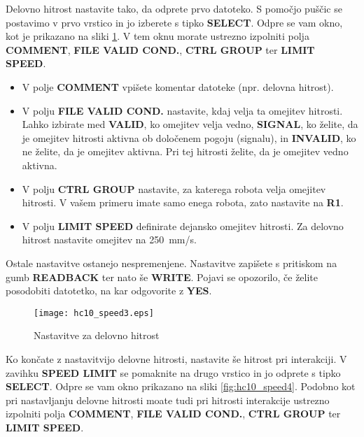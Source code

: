 Delovno hitrost nastavite tako, da odprete prvo datoteko. S pomočjo puščic se postavimo v prvo vrstico in jo izberete s tipko \textbf{SELECT}. Odpre se vam okno, kot je prikazano na sliki \ref{fig:hc10_speed3}. V tem oknu morate ustrezno izpolniti polja \textbf{COMMENT}, \textbf{FILE VALID COND.}, \textbf{CTRL GROUP} ter \textbf{LIMIT SPEED}.

\begin{itemize}
	\item V polje \textbf{COMMENT} vpišete komentar datoteke (npr. delovna hitrost).
	\item V polju \textbf{FILE VALID COND.} nastavite, kdaj velja ta omejitev hitrosti. Lahko izbirate med \textbf{VALID}, ko omejitev velja vedno, \textbf{SIGNAL}, ko želite, da je omejitev hitrosti aktivna ob določenem pogoju (signalu), in {\textbf{INVALID}}, ko ne želite, da je omejitev aktivna. Pri tej hitrosti želite, da je omejitev vedno aktivna.
	\item V polju \textbf{CTRL GROUP} nastavite, za katerega robota velja omejitev hitrosti. V vašem primeru imate samo enega robota, zato nastavite na \textbf{R1}.
	\item V polju \textbf{LIMIT SPEED} definirate dejansko omejitev hitrosti. Za delovno hitrost nastavite omejitev na 250~mm/s.
\end{itemize}

Ostale nastavitve ostanejo nespremenjene. Nastavitve zapišete s pritiskom na gumb \textbf{READBACK} ter nato še \textbf{WRITE}. Pojavi se opozorilo, če želite posodobiti datotetko, na kar odgovorite z \textbf{YES}.

\begin{figure}[!hbt]
	\centering
	\texttt{[image: hc10\_speed3.eps]}
	\caption{Nastavitve za delovno hitrost}
	\label{fig:hc10_speed3}
\end{figure}

Ko končate z nastavitvijo delovne hitrosti, nastavite še hitrost pri interakciji. V zavihku \textbf{SPEED LIMIT} se pomaknite na drugo vrstico in jo odprete s tipko \textbf{SELECT}. Odpre se vam okno prikazano na sliki \ref{fig:hc10_speed4}. Podobno kot pri nastavljanju delovne hitrosti moate tudi pri hitrosti interakcije ustrezno izpolniti polja \textbf{COMMENT}, \textbf{FILE VALID COND.}, \textbf{CTRL GROUP} ter \textbf{LIMIT SPEED}.


